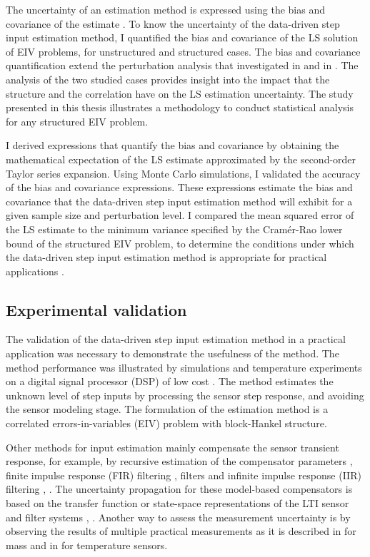 The uncertainty of an estimation method is expressed using the bias and covariance of the estimate \citep{Pintelon12Book}.
To know the uncertainty of the data-driven step input estimation method, I quantified the bias and covariance of the LS solution of EIV problems, for unstructured and structured cases. 
The bias and covariance quantification extend the perturbation analysis that investigated in \citep{Stewart90SPT} and in \citep{Vaccaro94}.
The analysis of the two studied cases provides insight into the impact that the structure and the correlation have on the LS estimation uncertainty.
The study presented in this thesis illustrates a methodology to conduct statistical analysis for any structured EIV problem.

I derived expressions that quantify the bias and covariance by obtaining the mathematical expectation of the LS estimate approximated by the second-order Taylor series expansion.
Using Monte Carlo simulations, I validated the accuracy of the bias and covariance expressions.
These expressions estimate the bias and covariance that the data-driven step input estimation method will exhibit for a given sample size and perturbation level.
I compared the mean squared error of the LS estimate to the minimum variance specified by the Cram\'er-Rao lower bound of the structured EIV problem, to determine the conditions under which the data-driven step input estimation method is appropriate for practical applications \citep{QuintanaCSDA}.


\subsection{Experimental validation}

The validation of the data-driven step input estimation method in a practical application was necessary to demonstrate the usefulness of the method.
The method performance was illustrated by simulations and temperature experiments on a digital signal processor (DSP) of low cost \citep{Markovsky15cep}.
The method estimates the unknown level of step inputs by processing the sensor step response, and 
avoiding the sensor modeling stage.
The formulation of the estimation method is a correlated errors-in-variables (EIV) problem with block-Hankel structure.

Other methods for input estimation mainly compensate the sensor transient response, for example, by 
recursive estimation of the compensator parameters \citep{Shu93}, 
finite impulse response (FIR) filtering \citep{Elster07}, \citep{Niedzwiecki16b} filters and 
infinite impulse response (IIR) filtering \citep{Pintelon90}, \citep{Elster08}.
The uncertainty propagation for these model-based compensators is based on the transfer function or state-space representations of the LTI sensor and filter systems \citep{Link09}, \citep{Hale09}.
Another way to assess the measurement uncertainty is by observing the results of multiple practical measurements as it is described in \citep{Pietrzak14} for mass and in \citep{Ogorevc16} for temperature sensors.

